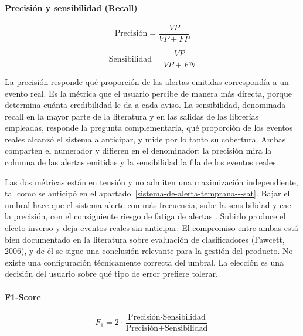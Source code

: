 \paragraph{Precisión y sensibilidad (Recall)}

\begin{equation}
\text{Precisión} = \frac{VP}{VP + FP}
\label{eq:precision}
\end{equation}

\begin{equation}
\text{Sensibilidad} = \frac{VP}{VP + FN}
\label{eq:sensibilidad}
\end{equation}

La precisión responde qué proporción de las alertas emitidas correspondía a un evento real. Es la métrica que el usuario percibe de manera más directa, porque determina cuánta credibilidad le da a cada aviso. La sensibilidad, denominada recall en la mayor parte de la literatura y en las salidas de las librerías empleadas, responde la pregunta complementaria, qué proporción de los eventos reales alcanzó el sistema a anticipar, y mide por lo tanto su cobertura. Ambas comparten el numerador y difieren en el denominador: la precisión mira la columna de las alertas emitidas y la sensibilidad la fila de los eventos reales.

Las dos métricas están en tensión y no admiten una maximización independiente, tal como se anticipó en el apartado~\ref{sistema-de-alerta-temprana---sat}. Bajar el umbral hace que el sistema alerte con más frecuencia, sube la sensibilidad y cae la precisión, con el consiguiente riesgo de fatiga de alertas \autocite{ancker2017}. Subirlo produce el efecto inverso y deja eventos reales sin anticipar. El compromiso entre ambas está bien documentado en la literatura sobre evaluación de clasificadores (Fawcett, 2006), y de él se sigue una conclusión relevante para la gestión del producto. No existe una configuración técnicamente correcta del umbral. La elección es una decisión del usuario sobre qué tipo de error prefiere tolerar.

\paragraph{F1-Score}

\begin{equation}
F_1 = 2 \cdot \frac{\text{Precisión} \cdot \text{Sensibilidad}}{\text{Precisión} + \text{Sensibilidad}}
\label{eq:f1}
\end{equation}

